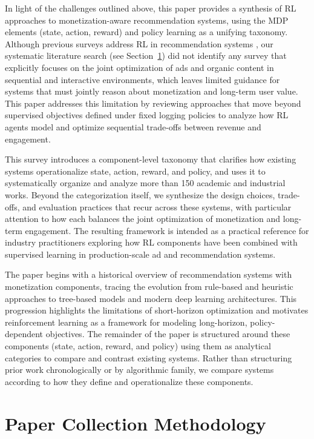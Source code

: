 \documentclass[manuscript,review,screen]{acmart}
\begin{document}
In light of the challenges outlined above, this paper provides a synthesis of RL approaches to monetization-aware recommendation systems, using the MDP elements (state, action, reward) and policy learning as a unifying taxonomy. Although previous surveys address RL in recommendation systems \cite{lin2023survey, afsar2022reinforcement}, our systematic literature search (see Section~\ref{sec:methodology}) did not identify any survey that explicitly focuses on the joint optimization of ads and organic content in sequential and interactive environments, which leaves limited guidance for systems that must jointly reason about monetization and long-term user value. This paper addresses this limitation by reviewing approaches that move beyond supervised objectives defined under fixed logging policies to analyze how RL agents model and optimize sequential trade-offs between revenue and engagement.

This survey introduces a component-level taxonomy that clarifies how existing systems operationalize state, action, reward, and policy, and uses it to systematically organize and analyze more than 150 academic and industrial works. Beyond the categorization itself, we synthesize the design choices, trade-offs, and evaluation practices that recur across these systems, with particular attention to how each balances the joint optimization of monetization and long-term engagement. The resulting framework is intended as a practical reference for industry practitioners exploring how RL components have been combined with supervised learning in production-scale ad and recommendation systems.

The paper begins with a historical overview of recommendation systems with monetization components, tracing the evolution from rule-based and heuristic approaches to tree-based models and modern deep learning architectures. This progression highlights the limitations of short-horizon optimization and motivates reinforcement learning as a framework for modeling long-horizon, policy-dependent objectives. The remainder of the paper is structured around these components (state, action, reward, and policy) using them as analytical categories to compare and contrast existing systems.  Rather than structuring prior work chronologically or by algorithmic family, we compare systems according to how they define and operationalize these components.

\section{Paper Collection Methodology}
\label{sec:methodology}
\end{document}
